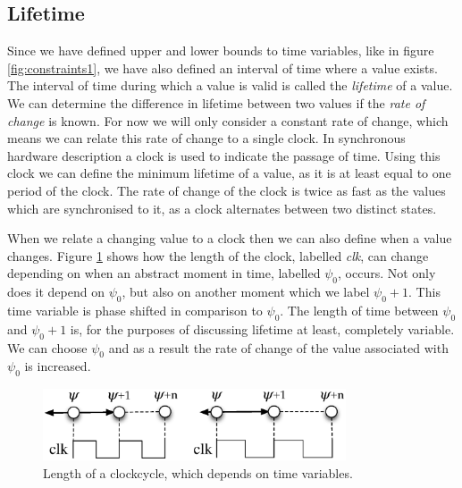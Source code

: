 %

\subsection{Lifetime}
Since we have defined upper and lower bounds to time variables, like in figure \ref{fig:constraints1}, we have also defined an interval of time where a value exists.
The interval of time during which a value is valid is called the \textit{lifetime} of a value.
We can determine the difference in lifetime between two values if the \textit{rate of change} is known.
For now we will only consider a constant rate of change, which means we can relate this rate of change to a single clock.
In synchronous hardware description a clock is used to indicate the passage of time.
Using this clock we can define the minimum lifetime of a value, as it is at least equal to one period of the clock. 
The rate of change of the clock is twice as fast as the values which are synchronised to it, as a clock alternates between two distinct states.

When we relate a changing value to a clock then we can also define when a value changes.
Figure \ref{fig:lifetime} shows how the length of the clock, labelled \textit{clk}, can change depending on when an abstract moment in time, labelled $\psi_0$, occurs.
Not only does it depend on $\psi_0$, but also on another moment which we label $\psi_0 + 1$.
This time variable is phase shifted in comparison to $\psi_0$. 
The length of time between $\psi_0$ and $\psi_0+1$ is, for the purposes of discussing lifetime at least, completely variable. 
We can choose $\psi_0$ and as a result the rate of change of the value associated with $\psi_0$ is increased.

\begin{figure}[h]
\includegraphics[width=0.8\textwidth]{images/lifetime}
\centering
\caption{Length of a clockcycle, which depends on time variables.} \label{fig:lifetime}
\end{figure}

